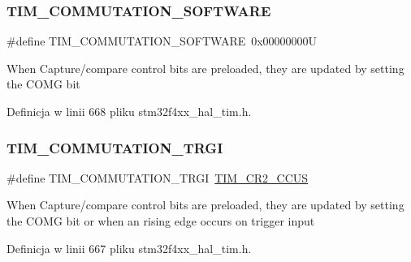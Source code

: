 \subsubsection{\texorpdfstring{T\+I\+M\+\_\+\+C\+O\+M\+M\+U\+T\+A\+T\+I\+O\+N\+\_\+\+S\+O\+F\+T\+W\+A\+RE}{TIM\_COMMUTATION\_SOFTWARE}}
{\footnotesize\ttfamily \#define T\+I\+M\+\_\+\+C\+O\+M\+M\+U\+T\+A\+T\+I\+O\+N\+\_\+\+S\+O\+F\+T\+W\+A\+RE~0x00000000U}

When Capture/compare control bits are preloaded, they are updated by setting the C\+O\+MG bit 

Definicja w linii 668 pliku stm32f4xx\+\_\+hal\+\_\+tim.\+h.

\mbox{\label{group___t_i_m___commutation___source_gab2e11763b5e061a5b3056ac970f57ab1}} 
\subsubsection{\texorpdfstring{T\+I\+M\+\_\+\+C\+O\+M\+M\+U\+T\+A\+T\+I\+O\+N\+\_\+\+T\+R\+GI}{TIM\_COMMUTATION\_TRGI}}
{\footnotesize\ttfamily \#define T\+I\+M\+\_\+\+C\+O\+M\+M\+U\+T\+A\+T\+I\+O\+N\+\_\+\+T\+R\+GI~\hyperlink{group___peripheral___registers___bits___definition_gaf0328c1339b2b1633ef7a8db4c02d0d5}{T\+I\+M\+\_\+\+C\+R2\+\_\+\+C\+C\+US}}

When Capture/compare control bits are preloaded, they are updated by setting the C\+O\+MG bit or when an rising edge occurs on trigger input 

Definicja w linii 667 pliku stm32f4xx\+\_\+hal\+\_\+tim.\+h.

